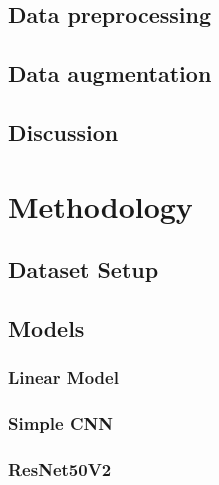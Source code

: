 \documentclass[biblatexBackend=bibtex]{tumthesis}
\begin{document}
\section{Data preprocessing}
\label{sec:dataset:data_pp}


\section{Data augmentation}
\label{sec:dataset:data_augmentation}


\section{Discussion}
\label{sec:dataset:discussion}


\chapter{Methodology}
\label{ch:methodology}


\section{Dataset Setup}
\label{sec:methodology:tfds}


\section{Models}
\label{sec:methodology:models}


\subsection{Linear Model}
\label{sec:methodology:lm}


\newpage
\subsection{Simple CNN}
\label{sec:methodology:simple_CNN}


\subsection{ResNet50V2}
\label{sec:methodology:RN50V2}

\end{document}
